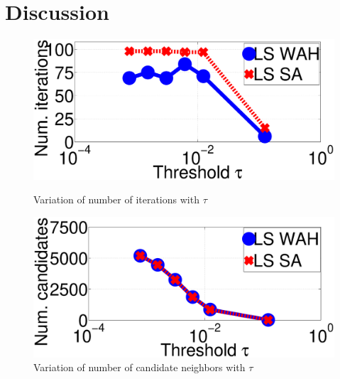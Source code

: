 \section{Discussion}
\label{sec:Discussion}
\begin{figure}[t!]
\centering
{}
\centering
  \includegraphics[width=\linewidth]{TagTree/RebuttalNIterationsWithTauNew} 
  \caption{Variation of number of iterations with $\tau$}
  \label{fig:TauNIterations}
\endminipage %
{}
  \includegraphics[width=\linewidth]{TagTree/RebuttalNCandidatesWithTauNew}
  \caption{Variation of number of candidate neighbors with $\tau$}
  \label{fig:TauNCandidate}
\endminipage %
\end{figure} 
